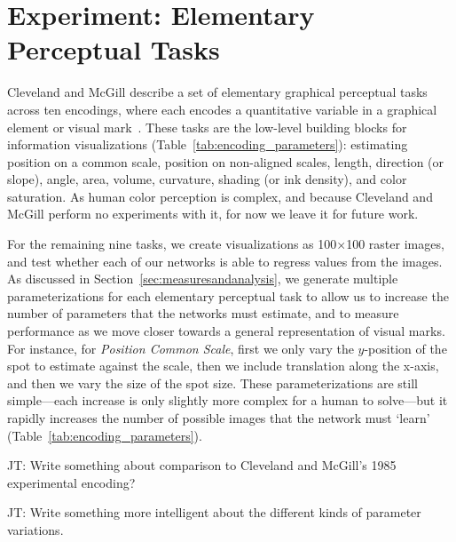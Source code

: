 \section{Experiment: Elementary Perceptual Tasks}

Cleveland and McGill describe a set of elementary graphical perceptual tasks across ten encodings, where each encodes a quantitative variable in a graphical element or visual mark~\cite{cleveland_mcgill,cleveland1985graphical}. These tasks are the low-level building blocks for information visualizations (Table~\ref{tab:encoding_parameters}): estimating position on a common scale, position on non-aligned scales, length, direction (or slope), angle, area, volume, curvature,  shading (or ink density), and color saturation. As human color perception is complex, and because Cleveland and McGill perform no experiments with it, for now we leave it for future work. 

For the remaining nine tasks, we create visualizations as 100$\times$100 raster images, and test whether each of our networks is able to regress values from the images. As discussed in Section~\ref{sec:measuresandanalysis}, we generate multiple parameterizations for each elementary perceptual task to allow us to increase the number of parameters that the networks must estimate, and to measure performance as we move closer towards a general representation of visual marks. For instance, for \emph{Position Common Scale}, first we only vary the $y$-position of the spot to estimate against the scale, then we include translation along the x-axis, and then we vary the size of the spot size. These parameterizations are still simple---each increase is only slightly more complex for a human to solve---but it rapidly increases the number of possible images that the network must `learn' (Table~\ref{tab:encoding_parameters}).

JT: Write something about comparison to Cleveland and McGill's 1985 experimental encoding?

JT: Write something more intelligent about the different kinds of parameter variations.





